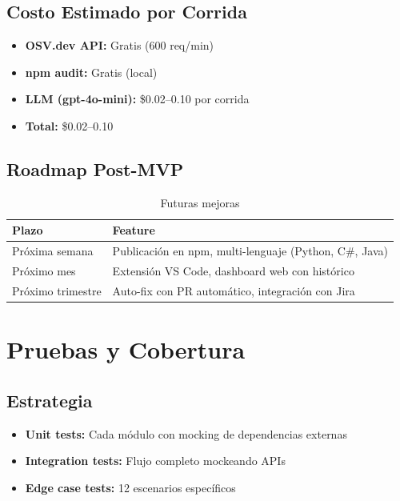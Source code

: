 \documentclass[11pt,a4paper]{article}
\begin{document}
\subsection{Costo Estimado por Corrida}

\begin{itemize}
  \item \textbf{OSV.dev API:} Gratis (600 req/min)
  \item \textbf{npm audit:} Gratis (local)
  \item \textbf{LLM (gpt-4o-mini):} \$0.02--0.10 por corrida
  \item \textbf{Total:} \$0.02--0.10
\end{itemize}

\subsection{Roadmap Post-MVP}

\begin{table}[H]
  \centering
  \caption{Futuras mejoras}
  \begin{tabularx}{\textwidth}{l X}
    \toprule
    \textbf{Plazo} & \textbf{Feature} \\
    \midrule
    Próxima semana & Publicación en npm, multi-lenguaje (Python, C\#, Java) \\
    Próximo mes & Extensión VS Code, dashboard web con histórico \\
    Próximo trimestre & Auto-fix con PR automático, integración con Jira \\
    \bottomrule
  \end{tabularx}
\end{table}

\section{Pruebas y Cobertura}

\subsection{Estrategia}

\begin{itemize}
  \item \textbf{Unit tests:} Cada módulo con mocking de dependencias externas
  \item \textbf{Integration tests:} Flujo completo mockeando APIs
  \item \textbf{Edge case tests:} 12 escenarios específicos
\end{itemize}
\end{document}
